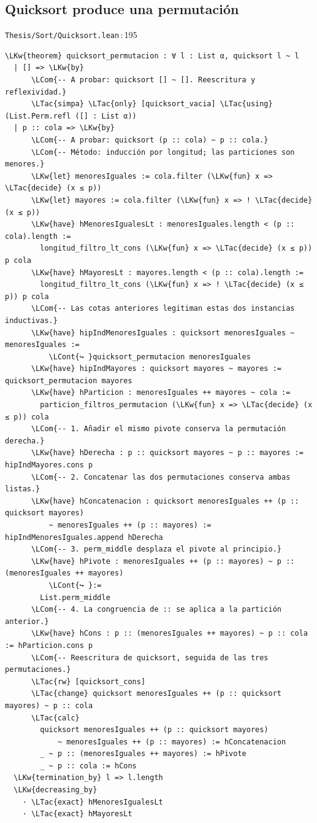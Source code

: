 \documentclass[11pt,a4paper]{article}
\newcommand{\LKw}[1]{\textcolor{kw}{\bfseries #1}}
\newcommand{\LTac}[1]{\textcolor{tac}{\bfseries #1}}
\newcommand{\LCom}[1]{\textcolor{com}{\itshape #1}}
\newcommand{\LCont}[1]{\textcolor{gray}{#1}}
\newcommand{\ruta}[2]{\texttt{#1}\,:\,#2}
\begin{document}
\subsection{Quicksort produce una permutación}\label{sec:guiada-quicksort}
\begin{codigolean}{\ruta{Thesis/Sort/Quicksort.lean}{195}}
\begin{Verbatim}[commandchars=\\\{\}]
\LKw{theorem} quicksort_permutacion : ∀ l : List α, quicksort l ~ l
  | [] => \LKw{by}
      \LCom{-- A probar: quicksort [] ~ []. Reescritura y reflexividad.}
      \LTac{simpa} \LTac{only} [quicksort_vacia] \LTac{using} (List.Perm.refl ([] : List α))
  | p :: cola => \LKw{by}
      \LCom{-- A probar: quicksort (p :: cola) ~ p :: cola.}
      \LCom{-- Método: inducción por longitud; las particiones son menores.}
      \LKw{let} menoresIguales := cola.filter (\LKw{fun} x => \LTac{decide} (x ≤ p))
      \LKw{let} mayores := cola.filter (\LKw{fun} x => ! \LTac{decide} (x ≤ p))
      \LKw{have} hMenoresIgualesLt : menoresIguales.length < (p :: cola).length :=
        longitud_filtro_lt_cons (\LKw{fun} x => \LTac{decide} (x ≤ p)) p cola
      \LKw{have} hMayoresLt : mayores.length < (p :: cola).length :=
        longitud_filtro_lt_cons (\LKw{fun} x => ! \LTac{decide} (x ≤ p)) p cola
      \LCom{-- Las cotas anteriores legitiman estas dos instancias inductivas.}
      \LKw{have} hipIndMenoresIguales : quicksort menoresIguales ~ menoresIguales :=
          \LCont{↪ }quicksort_permutacion menoresIguales
      \LKw{have} hipIndMayores : quicksort mayores ~ mayores := quicksort_permutacion mayores
      \LKw{have} hParticion : menoresIguales ++ mayores ~ cola :=
        particion_filtros_permutacion (\LKw{fun} x => \LTac{decide} (x ≤ p)) cola
      \LCom{-- 1. Añadir el mismo pivote conserva la permutación derecha.}
      \LKw{have} hDerecha : p :: quicksort mayores ~ p :: mayores := hipIndMayores.cons p
      \LCom{-- 2. Concatenar las dos permutaciones conserva ambas listas.}
      \LKw{have} hConcatenacion : quicksort menoresIguales ++ (p :: quicksort mayores)
          ~ menoresIguales ++ (p :: mayores) := hipIndMenoresIguales.append hDerecha
      \LCom{-- 3. perm_middle desplaza el pivote al principio.}
      \LKw{have} hPivote : menoresIguales ++ (p :: mayores) ~ p :: (menoresIguales ++ mayores)
          \LCont{↪ }:=
        List.perm_middle
      \LCom{-- 4. La congruencia de :: se aplica a la partición anterior.}
      \LKw{have} hCons : p :: (menoresIguales ++ mayores) ~ p :: cola := hParticion.cons p
      \LCom{-- Reescritura de quicksort, seguida de las tres permutaciones.}
      \LTac{rw} [quicksort_cons]
      \LTac{change} quicksort menoresIguales ++ (p :: quicksort mayores) ~ p :: cola
      \LTac{calc}
        quicksort menoresIguales ++ (p :: quicksort mayores)
            ~ menoresIguales ++ (p :: mayores) := hConcatenacion
        _ ~ p :: (menoresIguales ++ mayores) := hPivote
        _ ~ p :: cola := hCons
  \LKw{termination_by} l => l.length
  \LKw{decreasing_by}
    · \LTac{exact} hMenoresIgualesLt
    · \LTac{exact} hMayoresLt
\end{Verbatim}
\end{codigolean}
\end{document}
